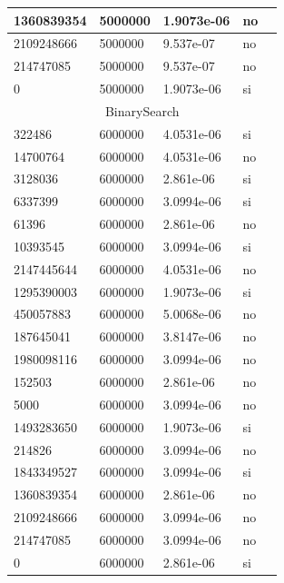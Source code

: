 \documentclass[12pt, fleqn]{article}                             %
\theoremstyle{break}                                            %
\begin{document}
\begin{longtable}{|m{5em}|m{5em}|m{10em}|m{5em}|@{}m{0pt}@{}}
            1360839354& 5000000  & 1.9073e-06 & no &\\[1em]    \hline
            2109248666& 5000000  & 9.537e-07 & no &\\[1em]    \hline
            214747085& 5000000  & 9.537e-07 & no &\\[1em]    \hline
            0& 5000000  & 1.9073e-06 & si &\\[1em]    \hline
            \multicolumn{5}{|c|}{BinarySearch}   \\          \hline
            322486& 6000000  & 4.0531e-06 & si &\\[1em]    \hline
            14700764& 6000000  & 4.0531e-06 & no &\\[1em]    \hline
            3128036& 6000000  & 2.861e-06 & si &\\[1em]    \hline
            6337399& 6000000  & 3.0994e-06 & si &\\[1em]    \hline
            61396& 6000000  & 2.861e-06 & no &\\[1em]    \hline
            10393545& 6000000  & 3.0994e-06 & si &\\[1em]    \hline
            2147445644& 6000000  & 4.0531e-06 & no &\\[1em]    \hline
            1295390003& 6000000  & 1.9073e-06 & si &\\[1em]    \hline
            450057883& 6000000  & 5.0068e-06 & no &\\[1em]    \hline
            187645041& 6000000  & 3.8147e-06 & no &\\[1em]    \hline
            1980098116& 6000000  & 3.0994e-06 & no &\\[1em]    \hline
            152503& 6000000  & 2.861e-06 & no &\\[1em]    \hline
            5000& 6000000  & 3.0994e-06 & no &\\[1em]    \hline
            1493283650& 6000000  & 1.9073e-06 & si &\\[1em]    \hline
            214826& 6000000  & 3.0994e-06 & no &\\[1em]    \hline
            1843349527& 6000000  & 3.0994e-06 & si &\\[1em]    \hline
            1360839354& 6000000  & 2.861e-06 & no &\\[1em]    \hline
            2109248666& 6000000  & 3.0994e-06 & no &\\[1em]    \hline
            214747085& 6000000  & 3.0994e-06 & no &\\[1em]    \hline
            0& 6000000  & 2.861e-06 & si &\\[1em]    \hline

\end{longtable}
\end{document}
